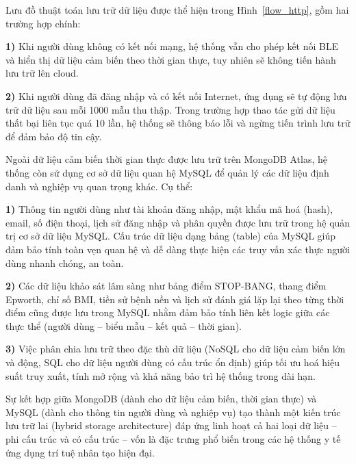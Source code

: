 Lưu đồ thuật toán lưu trữ dữ liệu được thể hiện trong Hình~\ref{flow_http}, 
gồm hai trường hợp chính:

\vspace{0.5em}
\noindent\textbf{1)} Khi người dùng không có kết nối mạng, hệ thống vẫn cho phép kết nối BLE và hiển thị dữ liệu cảm biến theo thời gian thực, tuy nhiên sẽ không tiến hành lưu trữ lên cloud.

\vspace{0.5em}
\noindent\textbf{2)} Khi người dùng đã đăng nhập và có kết nối Internet, ứng dụng sẽ tự động lưu trữ dữ liệu sau mỗi 1000 mẫu thu thập. Trong trường hợp thao tác gửi dữ liệu thất bại liên tục quá 10 lần, hệ thống sẽ thông báo lỗi và ngừng tiến trình lưu trữ để đảm bảo độ tin cậy.


Ngoài dữ liệu cảm biến thời gian thực được lưu trữ trên MongoDB Atlas, 
hệ thống còn sử dụng cơ sở dữ liệu quan hệ MySQL để quản lý các dữ liệu định 
danh và nghiệp vụ quan trọng khác. Cụ thể:

\vspace{0.5em}
\noindent\textbf{1)} Thông tin người dùng như tài khoản đăng nhập, mật khẩu mã hoá (hash), email, số điện thoại, lịch sử đăng nhập và phân quyền được lưu trữ trong hệ quản trị cơ sở dữ liệu MySQL. Cấu trúc dữ liệu dạng bảng (table) của MySQL giúp đảm bảo tính toàn vẹn quan hệ và dễ dàng thực hiện các truy vấn xác thực người dùng nhanh chóng, an toàn.

\vspace{0.5em}
\noindent\textbf{2)} Các dữ liệu khảo sát lâm sàng như bảng điểm STOP-BANG, thang điểm Epworth, chỉ số BMI, tiền sử bệnh nền và lịch sử đánh giá lặp lại theo từng thời điểm cũng được lưu trong MySQL nhằm đảm bảo tính liên kết logic giữa các thực thể (người dùng – biểu mẫu – kết quả – thời gian).

\vspace{0.5em}
\noindent\textbf{3)} Việc phân chia lưu trữ theo đặc thù dữ liệu (NoSQL cho dữ liệu cảm biến lớn và động, SQL cho dữ liệu người dùng có cấu trúc ổn định) giúp tối ưu hoá hiệu suất truy xuất, tính mở rộng và khả năng bảo trì hệ thống trong dài hạn.

Sự kết hợp giữa MongoDB (dành cho dữ liệu cảm biến, thời gian thực) 
và MySQL (dành cho thông tin người dùng và nghiệp vụ) tạo thành một kiến trúc 
lưu trữ lai (hybrid storage architecture) đáp ứng linh hoạt cả hai loại dữ 
liệu – phi cấu trúc và có cấu trúc – vốn là đặc trưng phổ biến trong các 
hệ thống y tế ứng dụng trí tuệ nhân tạo hiện đại.

